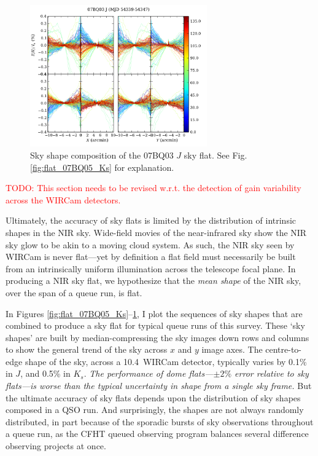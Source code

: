 \documentclass[iop]{emulateapj}
\newcommand{\changeit}[1]{\textcolor{red}{#1}} %
\begin{document}

\begin{figure}[t]
   \centering
       \includegraphics[width=3in]{figs/07BQ03_J.pdf}
   \caption[Sky shape composition of the 07BQ03 $J$ sky flat]{Sky shape composition of the 07BQ03 $J$ sky flat. See Fig. \ref{fig:flat_07BQ05_Ks} for explanation.}
   \label{fig:flat_07BQ03_J}
\end{figure}

\changeit{TODO: This section needs to be revised w.r.t. the detection of gain variability across the WIRCam detectors.}

Ultimately, the accuracy of sky flats is limited by the distribution of intrinsic shapes in the NIR sky. Wide-field movies of the near-infrared sky \citep{Adams:1996} show the NIR sky glow to be akin to a moving cloud system. As such, the NIR sky seen by WIRCam is never flat---yet by definition a flat field must necessarily be built from an intrinsically uniform illumination across the telescope focal plane. In producing a NIR sky flat, we hypothesize that the \emph{mean shape} of the NIR sky, over the span of a queue run, is flat.

In Figures \ref{fig:flat_07BQ05_Ks}--\ref{fig:flat_07BQ03_J}, I plot the sequences of sky shapes that are combined to produce a sky flat for typical queue runs of this survey. These `sky shapes' are built by median-compressing the sky images down rows and columns to show the general trend of the sky across $x$ and $y$ image axes. The centre-to-edge shape of the sky, across a 10.4\arcmin\ WIRCam detector, typically varies by 0.1\% in $J$, and 0.5\% in $K_s$. \emph{The performance of dome flats---$\pm2\%$ error relative to sky flats---is worse than the typical uncertainty in shape from a single sky frame.} But the ultimate accuracy of sky flats depends upon the distribution of sky shapes composed in a QSO run. And surprisingly, the shapes are not always randomly distributed, in part because of the sporadic bursts of sky observations throughout a queue run, as the CFHT queued observing program balances several difference observing projects at once.
\end{document}
